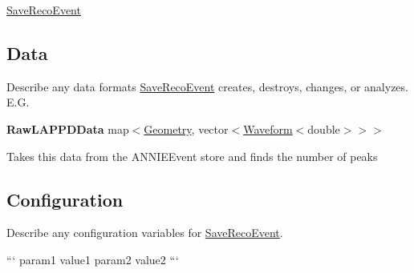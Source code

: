 \hyperlink{classSaveRecoEvent}{Save\-Reco\-Event}

\subsection*{Data}

Describe any data formats \hyperlink{classSaveRecoEvent}{Save\-Reco\-Event} creates, destroys, changes, or analyzes. E.\-G.

{\bfseries Raw\-L\-A\-P\-P\-D\-Data} {\ttfamily map$<$\hyperlink{classGeometry}{Geometry}, vector$<$\hyperlink{classWaveform}{Waveform}$<$double$>$$>$$>$}
\begin{DoxyItemize}
\item Takes this data from the {\ttfamily A\-N\-N\-I\-E\-Event} store and finds the number of peaks
\end{DoxyItemize}

\subsection*{Configuration}

Describe any configuration variables for \hyperlink{classSaveRecoEvent}{Save\-Reco\-Event}.

``` param1 value1 param2 value2 ``` 